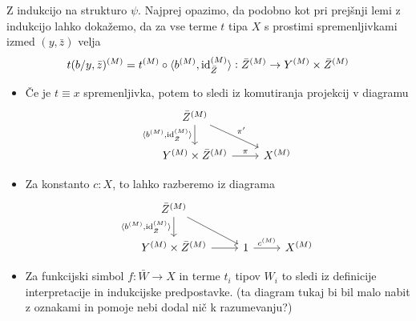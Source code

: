 \documentclass[../kategoricna_logika.tex]{subfiles}
\begin{document}
\begin{dokaz}
  Z indukcijo na strukturo $\psi$.  Najprej opazimo, da podobno kot
  pri prejšnji lemi z indukcijo lahko dokažemo, da za vse terme $t$
  tipa $X$ s prostimi spremenljivkami izmed $(y, \bar{z})$ velja
  $$t(b/y, \bar{z})^{(M)} = t^{(M)} \circ \langle b^{(M)}, \mathrm{id}_{\bar{Z}}^{(M)} \rangle : \bar{Z}^{(M)} \to Y^{(M)} \times \bar{Z}^{(M)}$$
  \begin{itemize}
  \item Če je $t \equiv x$ spremenljivka, potem to sledi iz
    komutiranja projekcij v diagramu
    \begin{equation*}
      \begin{tikzcd}
        \bar{Z}^{(M)} \ar[d, "\fprod{b^{(M)}, \mathrm{id}_{\bar{Z}}^{(M)}}"'] \ar[dr, "\pi'"] & \\
        Y^{(M)} \times \bar{Z}^{(M)} \ar[r, "\pi"] & X^{(M)}
      \end{tikzcd}
    \end{equation*}
    
  \item Za konstanto ${c : X}$, to lahko razberemo iz diagrama
    \begin{equation*}
      \begin{tikzcd}
        \bar{Z}^{(M)} \ar[d, "\fprod{b^{(M)}, \mathrm{id}_{\bar{Z}}^{(M)}}"'] \ar[dr] & & \\
        Y^{(M)} \times \bar{Z}^{(M)} \ar[r] & 1 \ar[r, "c^{(M)}"] &
        X^{(M)}
      \end{tikzcd}
    \end{equation*}

  \item Za funkcijski simbol $f : \bar{W} \to X$ in terme $t_i$ tipov
    $W_i$ to sledi iz definicije interpretacije in indukcijske
    predpostavke.  (ta diagram tukaj bi bil malo nabit z oznakami in
    pomoje nebi dodal nič k razumevanju?)
  \end{itemize}


\end{dokaz}
\end{document}

